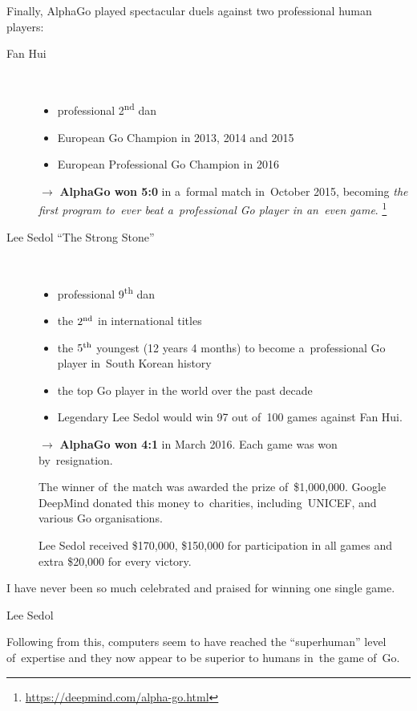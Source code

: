 Finally, AlphaGo played spectacular duels against two professional human players:
\begin{description}
  \item [Fan Hui]~
    \begin{itemize}
      \item professional 2\textsuperscript{nd} dan
      \item European Go Champion in 2013, 2014 and 2015
      \item European Professional Go Champion in 2016 
    \end{itemize}
    $\rightarrow$ \textbf{AlphaGo won 5:0} in a~formal match in~October 2015, becoming \emph{the first program to~ever beat a~professional Go player in an~even game}.%
    \footnote{\href{https://deepmind.com/alpha-go.html}{https://deepmind.com/alpha-go.html}}

  \item [Lee Sedol ``The Strong Stone'']~
    \begin{itemize}
      \item professional 9\textsuperscript{th} dan 
      \item the $2\textsuperscript{nd}$ in international titles
      \item the $5\textsuperscript{th}$ youngest (12 years 4 months) to become a~professional Go player in~South Korean history
      \item the top Go player in the world over the past decade
      \item Legendary Lee Sedol would win 97 out of~100 games against Fan Hui.
    \end{itemize}
    $\rightarrow$ \textbf{AlphaGo won 4:1} in March 2016.
    Each game was won by~resignation.

    The winner of~the match was awarded the prize of~\$1,000,000.
    Google DeepMind donated this money to~charities, including~UNICEF, and various Go organisations.

    Lee Sedol received \$170,000, \$150,000 for participation in all games and extra \$20,000 for every victory.
\end{description}

\epigraph{
  I have never been so much celebrated and praised for winning one single game.
}{Lee Sedol}
Following from this, computers seem to have reached the ``superhuman'' level of~expertise and they now appear to be superior to humans in~the game of~Go.

